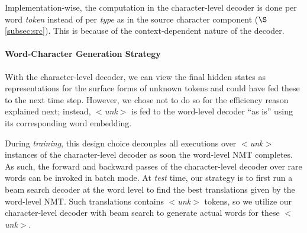 \documentclass[11pt]{article}
\newcommand{\todo}[1]{{\color{brown} TODO: #1}}
\newcommand{\eq}[1]{Eq.~(\ref{#1})}
\newcommand{\unk}{$<${\it unk}$>$}
\begin{document}
Implementation-wise, the computation in the
character-level decoder is done per word {\it token} instead of per {\it type} as in the source
character component ($\S$\ref{subsec:src}). 
This is because of the context-dependent nature of the decoder.



\paragraph{Word-Character Generation Strategy}
\label{subsubsec:strategy}
With the character-level decoder, we can view the final hidden states as representations for
the surface forms of unknown tokens and could have fed these to the next
time step. However, we chose not to do so for the efficiency reason explained
next; instead, \unk{} is fed to the word-level decoder
``as is'' using its corresponding word embedding.

During {\it training}, this design choice decouples all executions over \unk{} instances of the
character-level decoder as soon the word-level NMT
completes. As such, the forward and backward passes of the character-level
decoder over rare words can be invoked in batch mode. At {\it test} time,
our strategy is to first run a beam search decoder at the word level to
find the best translations given by the
word-level NMT. Such translations contains \unk{} tokens, so we utilize our
character-level decoder with beam search to generate actual words for these \unk{}.
\end{document}

